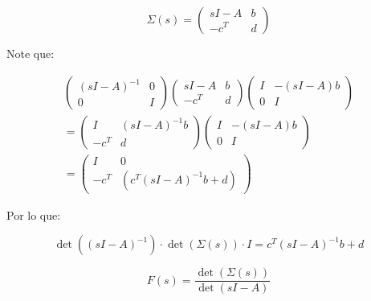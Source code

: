         \begin{equation}
            \Sigma(s) =
            \begin{pmatrix}
            sI - A & b \\
            -c^T & d
            \end{pmatrix}
        \end{equation}

        Note que:

        \begin{multline}
            \begin{pmatrix}
            (sI - A)^{-1} & 0 \\
            0 & I
            \end{pmatrix}
            \begin{pmatrix}
            sI - A & b \\
            -c^T & d
            \end{pmatrix}
            \begin{pmatrix}
            I & -(sI - A)b \\
            0 & I
            \end{pmatrix}
            \\
            =
            \begin{pmatrix}
            I & (sI - A)^{-1} b \\
            -c^T & d
            \end{pmatrix}
            \begin{pmatrix}
            I & -(sI - A)b \\
            0 & I
            \end{pmatrix}
            \\
            =
            \begin{pmatrix}
            I & 0 \\
            -c^T & (c^T(sI - A)^{-1} b + d)
            \end{pmatrix}
            \nonumber
        \end{multline}

        Por lo que:

        \begin{equation*}
            \det{\left( (sI - A)^{-1} \right)} \cdot \det{\left( \Sigma(s) \right)} \cdot I = c^T(sI - A)^{-1} b + d
        \end{equation*}

        \begin{equation}
            F(s) = \frac{\det{\left( \Sigma(s) \right)}}{\det{\left( sI - A \right)}}
        \end{equation}


